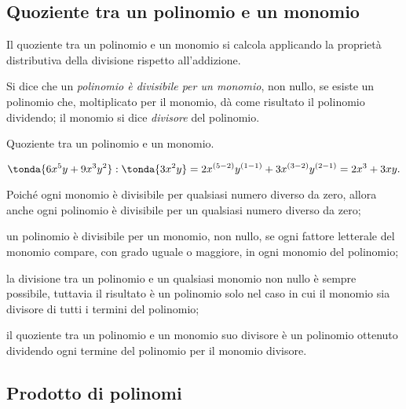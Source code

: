 
\subsection{Quoziente tra un polinomio e un monomio}
\label{subsec:10_poli_quozientepermonomio}

Il quoziente tra un polinomio e un monomio si calcola applicando la
proprietà distributiva della divisione rispetto
all'addizione.

\begin{definizione}
 Si dice che un \emph{polinomio è divisibile per un monomio}, non
nullo, se esiste un polinomio che, moltiplicato per il monomio, dà
come risultato il polinomio dividendo; il monomio si dice
\emph{divisore} del polinomio.
\end{definizione}

 \begin{esempio}
 Quoziente tra un polinomio e un monomio.
 
\[\tonda{6x^{5}y+9x^{3}y^{2}}:\tonda{3x^{2}y}=2x^{(5-2)}y^{(1-1)}
+3x^{(3-2)}y^{(2-1)}=2x^{3}+3{xy}.\]
 \end{esempio}
\osservazione

\begin{enumeratea}
\item Poiché ogni monomio è divisibile per qualsiasi numero diverso
da zero, allora anche ogni polinomio è divisibile per un qualsiasi
numero diverso da zero;
\item un polinomio è divisibile per un monomio, non nullo, se ogni
fattore letterale del monomio compare, con grado uguale o
maggiore, in ogni monomio del polinomio;
\item la divisione tra un polinomio e un qualsiasi monomio non nullo è
sempre possibile, tuttavia il risultato è un polinomio solo nel caso
in cui il monomio sia divisore di tutti i termini del polinomio;
\item il quoziente tra un polinomio e un monomio suo divisore è un
polinomio ottenuto dividendo ogni termine del polinomio per il monomio
divisore.
\end{enumeratea}


\subsection{Prodotto di polinomi}
\label{subsec:10_poli_prodotto}

